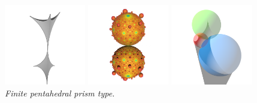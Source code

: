 \begin{figure}[h!tbp]
 \begin{minipage}[t]{0.5\textwidth}
  \begin{minipage}[t]{0.24\textwidth}
   \centering
   \includegraphics[width=1.4in, height=1.4in, keepaspectratio]{./img/application/sphairahedron/variations/pentahedralPrism/finiteSphairahedron.png}
  \end{minipage}
  \hspace*{\fill}
  \begin{minipage}[t]{0.24\textwidth}
   \centering
   \includegraphics[width=1.4in, height=1.4in, keepaspectratio]{./img/application/sphairahedron/variations/pentahedralPrism/finiteLimitset.png}
  \end{minipage}
  \hspace*{\fill}
  \caption{\textit{Finite pentahedral prism type.}}
  \label{fig:semi-finite}
 \end{minipage}
 \begin{minipage}[t]{0.5\textwidth}
  \begin{minipage}[t]{0.24\textwidth}
   \centering
   \includegraphics[width=1.4in, height=1.4in, keepaspectratio]
   {./img/application/sphairahedron/variations/cube/prismType3.png}
  \end{minipage}
  \hspace*{\fill}

\end{minipage}
\end{figure}
